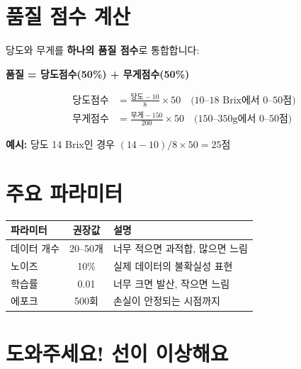 \documentclass[11pt, a4paper]{article}
\begin{document}
\section{품질 점수 계산}

당도와 무게를 \textbf{하나의 품질 점수}로 통합합니다:

\begin{tcolorbox}[colback=warmcream, colframe=bordercolor]
\begin{center}
\textbf{품질 = 당도점수(50\%) + 무게점수(50\%)}
\end{center}

\begin{align*}
\text{당도점수} &= \frac{\text{당도} - 10}{8} \times 50 \quad \text{(10--18 Brix에서 0--50점)} \\[0.3cm]
\text{무게점수} &= \frac{\text{무게} - 150}{200} \times 50 \quad \text{(150--350g에서 0--50점)}
\end{align*}

\textbf{예시:} 당도 14 Brix인 경우 $(14-10)/8 \times 50 = 25$점
\end{tcolorbox}

\section{주요 파라미터}

\begin{center}
\begin{tabular}{lcp{7cm}}
    \toprule
    \textbf{파라미터} & \textbf{권장값} & \textbf{설명} \\
    \midrule
    데이터 개수 & 20--50개 & 너무 적으면 과적합, 많으면 느림 \\
    노이즈 & 10\% & 실제 데이터의 불확실성 표현 \\
    학습률 & 0.01 & 너무 크면 발산, 작으면 느림 \\
    에포크 & 500회 & 손실이 안정되는 시점까지 \\
    \bottomrule
\end{tabular}
\end{center}

\section{도와주세요! 선이 이상해요}
\end{document}
